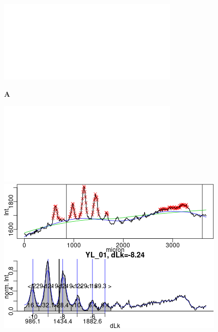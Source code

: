 \documentclass[10pt,a4]{article}
\begin{document}
\begin{figure}[ht!]
  \begin{minipage}{.49\textwidth}
    \includegraphics[width=\textwidth]{figures/diurnal/20130620_pCA_CQ1.png}
    
    \vspace{-.5cm}
    \textbf{A}
    
    \includegraphics[width=\textwidth]{figures/diurnal/20130821_pCA_CQ20.png}
  \end{minipage}
  \begin{minipage}{.39\textwidth}
    \includegraphics[width=\textwidth]{figures/diurnal/YL_01_cropped.png}
   

\end{minipage}
\end{figure}
\end{document}

